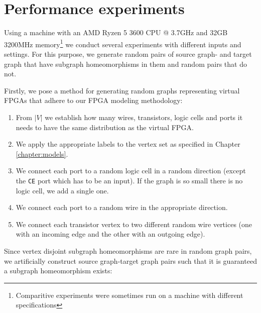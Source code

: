 \chapter{Performance experiments}
Using a machine with an AMD Ryzen 5 3600 CPU @ 3.7GHz and 32GB 3200MHz memory\footnote{Comparitive experiments were sometimes run on a machine with different specifications} we conduct several experiments with different inputs and settings. For this purpose, we generate random pairs of source graph- and target graph that have subgraph homeomorphisms in them and random pairs that do not.

Firstly, we pose a method for generating random graphs representing virtual FPGAs that adhere to our FPGA modeling methodology:

\begin{enumerate}
\item From $|V|$ we establish how many wires, transistors, logic cells and ports it needs to have the same distribution as the virtual FPGA.
\item We apply the appropriate labels to the vertex set as specified in Chapter \ref{chapter:models}.
\item We connect each port to a random logic cell in a random direction (except the \texttt{CE} port which has to be an input). If the graph is so small there is no logic cell, we add a single one.
\item We connect each port to a random wire in the appropriate direction.
\item We connect each transistor vertex to two different random wire vertices (one with an incoming edge and the other with an outgoing edge).
\end{enumerate}

Since vertex disjoint subgraph homeomorphisms are rare in random graph pairs, we artificially construct source graph-target graph pairs such that it is guaranteed a subgraph homeomorphism exists:

